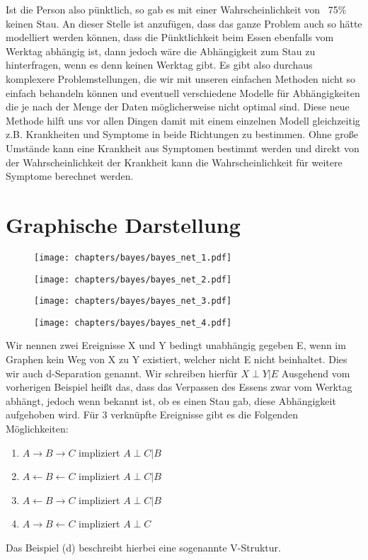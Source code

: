 %
Ist die Person also pünktlich, so gab es mit einer Wahrscheinlichkeit von ~75\% keinen Stau.
%
An dieser Stelle ist anzufügen, dass das ganze Problem auch so hätte modelliert werden können, dass die Pünktlichkeit beim Essen ebenfalls vom Werktag abhängig ist, dann jedoch wäre die Abhängigkeit zum Stau zu hinterfragen, wenn es denn keinen Werktag gibt.
Es gibt also durchaus komplexere Problemstellungen, die wir mit unseren einfachen Methoden nicht so einfach behandeln können und eventuell verschiedene Modelle für Abhängigkeiten die je nach der Menge der Daten möglicherweise nicht optimal sind.
%
Diese neue Methode hilft uns vor allen Dingen damit mit einem einzelnen Modell gleichzeitig z.B. Krankheiten und Symptome in beide Richtungen zu bestimmen. Ohne große Umstände kann eine Krankheit aus Symptomen bestimmt werden und direkt von der Wahrscheinlichkeit der Krankheit kann die Wahrscheinlichkeit für weitere Symptome berechnet werden.
%
\section{Graphische Darstellung}
\begin{figure}[h]
    \centering
    \texttt{[image: chapters/bayes/bayes\_net\_1.pdf]}
\end{figure}
\begin{figure}[h]
    \centering
    \texttt{[image: chapters/bayes/bayes\_net\_2.pdf]}
\end{figure}
\begin{figure}[h]
    \centering
    \texttt{[image: chapters/bayes/bayes\_net\_3.pdf]}
\end{figure}
\begin{figure}[h]
    \centering
    \texttt{[image: chapters/bayes/bayes\_net\_4.pdf]}
\end{figure}

Wir nennen zwei Ereignisse X und Y bedingt unabhängig gegeben E, wenn im Graphen kein Weg von X zu Y existiert, welcher nicht E nicht beinhaltet.
Dies wir auch d-Separation genannt.
Wir schreiben hierfür
$X \perp Y | E$
Ausgehend vom vorherigen Beispiel heißt das, dass das Verpassen des Essens zwar vom Werktag abhängt, jedoch wenn bekannt ist, ob es einen Stau gab, diese Abhängigkeit aufgehoben wird.
Für 3 verknüpfte Ereignisse gibt es die Folgenden Möglichkeiten:
\begin{enumerate}[label=(\alph*)]
\item $A \rightarrow B \rightarrow C$ impliziert $A \perp C | B$
\item $A \leftarrow B \leftarrow C$ impliziert $A \perp C | B$
\item $A \leftarrow B \rightarrow C$ impliziert $A \perp C | B$
\item $A \rightarrow B \leftarrow C$ impliziert $A \perp C$
\end{enumerate}
Das Beispiel (d) beschreibt hierbei eine sogenannte V-Struktur.

